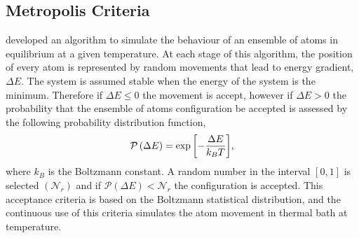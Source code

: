 \subsection{Metropolis Criteria}
\citet{Metropolis_1953} developed an algorithm to simulate the behaviour of an ensemble of atoms in equilibrium at a given temperature. At each stage of this algorithm, the position of every atom is represented by random movements that lead to energy gradient, $\Delta E$. The system is assumed stable when the energy of the system is the minimum. Therefore if $\Delta E \le 0$ the movement is accept, however if $\Delta E > 0$ the probability that the ensemble of atoms configuration be accepted is assessed by the following probability distribution function,
\begin{equation}
  \mathcal{P}\left(\Delta E\right) = \exp{\left[-\displaystyle\frac{\Delta E}{k_{B}T}\right]}, 
\end{equation}
where $k_{B}$ is the Boltzmann constant. A random number in the interval $[0,1]$ is selected $\left(\mathcal{N}_{r}\right)$ and if $\mathcal{P}\left(\Delta E\right) < \mathcal{N}_{r}$ the configuration is accepted. This acceptance criteria is based on the Boltzmann statistical distribution, and the continuous use of this criteria simulates the atom movement in thermal bath at temperature. 

